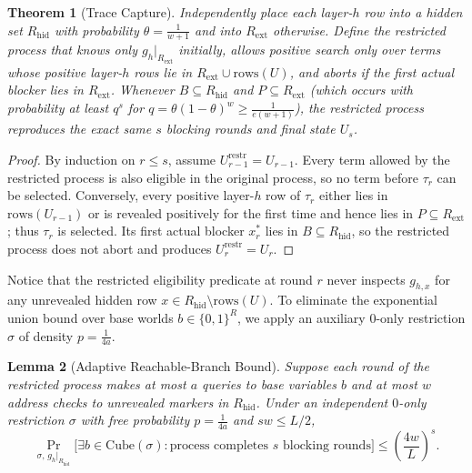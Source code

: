 \documentclass[11pt,a4paper]{article}
\newtheorem{theorem}{Theorem}[section]
\newtheorem{lemma}[theorem]{Lemma}
\theoremstyle{definition}
\theoremstyle{remark}
\newcommand{\Prb}{\Pr}
\begin{document}
\begin{theorem}[Trace Capture]
\label{thm:trace-capture}
Independently place each layer-$h$ row into a hidden set $R_{\mathrm{hid}}$ with probability $\theta = \frac{1}{w+1}$ and into $R_{\mathrm{ext}}$ otherwise. Define the restricted process that knows only $g_h|_{R_{\mathrm{ext}}}$ initially, allows positive search only over terms whose positive layer-$h$ rows lie in $R_{\mathrm{ext}} \cup \mathrm{rows}(U)$, and aborts if the first actual blocker lies in $R_{\mathrm{ext}}$. Whenever $B \subseteq R_{\mathrm{hid}}$ and $P \subseteq R_{\mathrm{ext}}$ (which occurs with probability at least $q^s$ for $q = \theta(1-\theta)^w \ge \frac{1}{e(w+1)}$), the restricted process reproduces the exact same $s$ blocking rounds and final state $U_s$.
\end{theorem}

\begin{proof}
By induction on $r \le s$, assume $U_{r-1}^{\mathrm{restr}} = U_{r-1}$. Every term allowed by the restricted process is also eligible in the original process, so no term before $\tau_r$ can be selected. Conversely, every positive layer-$h$ row of $\tau_r$ either lies in $\mathrm{rows}(U_{r-1})$ or is revealed positively for the first time and hence lies in $P \subseteq R_{\mathrm{ext}}$; thus $\tau_r$ is selected. Its first actual blocker $x_r^*$ lies in $B \subseteq R_{\mathrm{hid}}$, so the restricted process does not abort and produces $U_r^{\mathrm{restr}} = U_r$.
\end{proof}

Notice that the restricted eligibility predicate at round $r$ never inspects $g_{h,x}$ for any unrevealed hidden row $x \in R_{\mathrm{hid}} \setminus \mathrm{rows}(U)$. To eliminate the exponential union bound over base worlds $b \in \{0,1\}^R$, we apply an auxiliary $0$-only restriction $\sigma$ of density $p = \frac{1}{4a}$.

\begin{lemma}[Adaptive Reachable-Branch Bound]
\label{lem:reachable-branch}
Suppose each round of the restricted process makes at most $a$ queries to base variables $b$ and at most $w$ address checks to unrevealed markers in $R_{\mathrm{hid}}$. Under an independent $0$-only restriction $\sigma$ with free probability $p = \frac{1}{4a}$ and $sw \le L/2$,
\[
  \Prb_{\sigma,\, g_h|_{R_{\mathrm{hid}}}}\bigl[\exists b \in \mathrm{Cube}(\sigma) : \text{process completes } s \text{ blocking rounds}\bigr]
  \le \left(\frac{4w}{L}\right)^s.
\]
\end{lemma}
\end{document}
